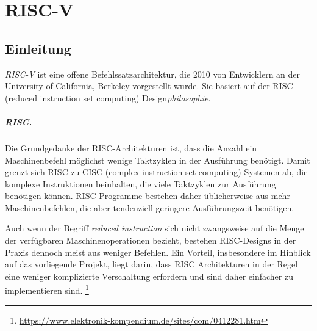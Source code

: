 \chapter{RISC-V} %
\label{RISC-V} %

\section{Einleitung}
\emph{RISC-V} ist eine offene Befehlssatzarchitektur, die 2010 von Entwicklern an der University of California, Berkeley vorgestellt wurde. Sie basiert auf der RISC (reduced instruction set computing) Design\textit{philosophie}. 

\paragraph{RISC.} Die Grundgedanke der RISC-Architekturen ist, dass die Anzahl ein Maschinenbefehl möglichst wenige Taktzyklen in der Ausführung benötigt. Damit grenzt sich RISC zu CISC (complex instruction set computing)-Systemen ab, die komplexe Instruktionen beinhalten, die viele Taktzyklen zur Ausführung benötigen können. RISC-Programme bestehen daher üblicherweise aus mehr Maschinenbefehlen, die aber tendenziell geringere Ausführungszeit benötigen.


Auch wenn der Begriff \textit{reduced instruction} sich nicht zwangsweise auf die Menge der verfügbaren Maschinenoperationen bezieht, bestehen RISC-Designs in der Praxis dennoch meist aus weniger Befehlen. Ein Vorteil, insbesondere im Hinblick auf das vorliegende Projekt, liegt darin, dass RISC Architekturen in der Regel eine weniger komplizierte Verschaltung erfordern und sind daher einfacher zu implementieren sind. \footnote{\url{https://www.elektronik-kompendium.de/sites/com/0412281.htm}} 


